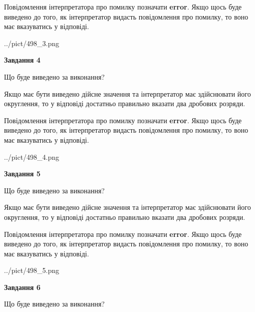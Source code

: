 \documentclass[12pt, ukrainian]{article}
\begin{document}
{\begin {Large}
Повідомлення інтерпретатора про помилку позначати \textbf{error}.
Якщо щось буде виведено до того, як інтерпретатор видасть повідомлення про помилку, 
то воно має вказуватись у відповіді. \par

\begin{center}
	{../pict/498_3.png}
\end{center}
\newpage

{\begin {center}\textbf{Завдання 4}\end {center}}\par
Що буде виведено за виконання? \par

Якщо має бути виведено дійсне значення та інтерпретатор має здійснювати його округлення, 
то у відповіді достатньо правильно вказати два дробових розряди.

Повідомлення інтерпретатора про помилку позначати \textbf{error}.
Якщо щось буде виведено до того, як інтерпретатор видасть повідомлення про помилку, 
то воно має вказуватись у відповіді. \par

\begin{center}
	{../pict/498_4.png}
\end{center}
\newpage

{\begin {center}\textbf{Завдання 5}\end {center}}\par
Що буде виведено за виконання? \par

Якщо має бути виведено дійсне значення та інтерпретатор має здійснювати його округлення, 
то у відповіді достатньо правильно вказати два дробових розряди.

Повідомлення інтерпретатора про помилку позначати \textbf{error}.
Якщо щось буде виведено до того, як інтерпретатор видасть повідомлення про помилку, 
то воно має вказуватись у відповіді. \par

\begin{center}
	{../pict/498_5.png}
\end{center}
\newpage

{\begin {center}\textbf{Завдання 6}\end {center}}\par
Що буде виведено за виконання? \par


\end{Large}}
\end{document}
